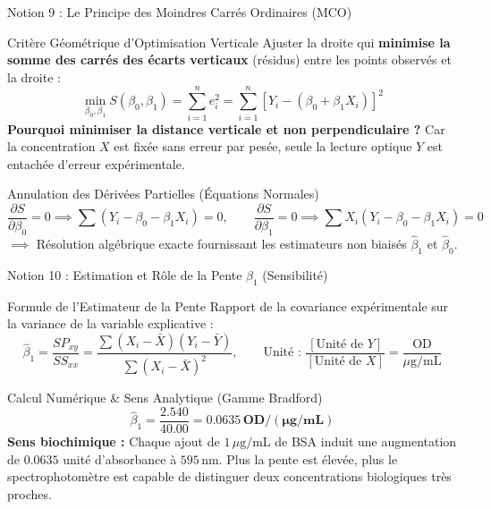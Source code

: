 \documentclass[aspectratio=169,10pt]{beamer}
\begin{document}
\begin{frame}{Notion 9 : Le Principe des Moindres Carrés Ordinaires (MCO)}
  \begin{conceptbox}{Critère Géométrique d'Optimisation Verticale}
    \footnotesize
    Ajuster la droite qui \textbf{minimise la somme des carrés des écarts verticaux} (résidus) entre les points observés et la droite :
    \begin{equation*}
      \min_{\beta_0, \beta_1} S(\beta_0, \beta_1) = \sum_{i=1}^n e_i^2 = \sum_{i=1}^n [Y_i - (\beta_0 + \beta_1 X_i)]^2
    \end{equation*}
    \textbf{Pourquoi minimiser la distance verticale et non perpendiculaire ?}
    Car la concentration $X$ est fixée sans erreur par pesée, seule la lecture optique $Y$ est entachée d'erreur expérimentale.
  \end{conceptbox}
  \vspace{1mm}
  \begin{biobox}{Annulation des Dérivées Partielles (Équations Normales)}
    \footnotesize
    \begin{equation*}
      \frac{\partial S}{\partial \beta_0} = 0 \implies \sum (Y_i - \beta_0 - \beta_1 X_i) = 0, \qquad \frac{\partial S}{\partial \beta_1} = 0 \implies \sum X_i (Y_i - \beta_0 - \beta_1 X_i) = 0
    \end{equation*}
    $\implies$ Résolution algébrique exacte fournissant les estimateurs non biaisés $\hat{\beta}_1$ et $\hat{\beta}_0$.
  \end{biobox}
\end{frame}

\begin{frame}{Notion 10 : Estimation et Rôle de la Pente $\hat{\beta}_1$ (Sensibilité)}
  \begin{conceptbox}{Formule de l'Estimateur de la Pente}
    \footnotesize
    Rapport de la covariance expérimentale sur la variance de la variable explicative :
    \begin{equation*}
      \hat{\beta}_1 = \frac{SP_{xy}}{SS_{xx}} = \frac{\sum (X_i - \bar{X})(Y_i - \bar{Y})}{\sum (X_i - \bar{X})^2}, \qquad \text{Unité : } \frac{[\text{Unité de } Y]}{[\text{Unité de } X]} = \frac{\text{OD}}{\mu\text{g/mL}}
    \end{equation*}
  \end{conceptbox}
  \vspace{1mm}
  \begin{biobox}{Calcul Numérique \& Sens Analytique (Gamme Bradford)}
    \footnotesize
    \begin{equation*}
      \hat{\beta}_1 = \frac{2.540}{40.00} = \mathbf{0.0635\,\text{OD}/(\mu\text{g/mL})}
    \end{equation*}
    \textbf{Sens biochimique :}
    Chaque ajout de $1\,\mu\text{g/mL}$ de BSA induit une augmentation de $0.0635$ unité d'absorbance à $595\,\text{nm}$.
    Plus la pente est élevée, plus le spectrophotomètre est capable de distinguer deux concentrations biologiques très proches.
  \end{biobox}
\end{frame}
\end{document}
